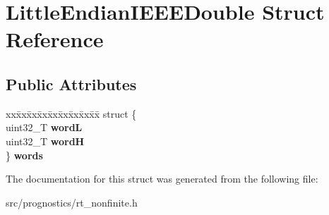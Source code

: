\hypertarget{structLittleEndianIEEEDouble}{}\section{Little\+Endian\+I\+E\+E\+E\+Double Struct Reference}
\label{structLittleEndianIEEEDouble}
\subsection*{Public Attributes}
\begin{DoxyCompactItemize}
\item 
\mbox{\label{structLittleEndianIEEEDouble_aaf744e23459379d9d97fe814084c94a4}} 
\begin{tabbing}
xx\=xx\=xx\=xx\=xx\=xx\=xx\=xx\=xx\=\kill
struct \{\\
\>uint32\_T {\bfseries wordL}\\
\>uint32\_T {\bfseries wordH}\\
\} {\bfseries words}\\

\end{tabbing}\end{DoxyCompactItemize}


The documentation for this struct was generated from the following file\+:\begin{DoxyCompactItemize}
\item 
src/prognostics/rt\+\_\+nonfinite.\+h\end{DoxyCompactItemize}
